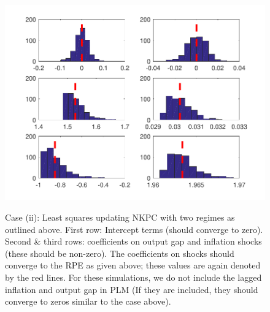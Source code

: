 \documentclass[12pt,reqno]{article}
\numberwithin{equation}{section}
\begin{document}
\newpage



\begin{figure}[H]
\caption{ Case (ii): Least squares updating NKPC with two regimes as outlined above.   First row: Intercept terms (should converge to zero). Second \& third rows: coefficients on output gap and inflation shocks (these should be non-zero). The coefficients on shocks should converge to the RPE as given above; these values are again denoted by the red lines. For these simulations, we do not include the lagged inflation and output gap in PLM (If they are included, they should converge to zeros similar to the case above). } 

\includegraphics[scale=0.6]{MC_MS_MSV_withoutLags.pdf}\\
\end{figure}
\end{document}
